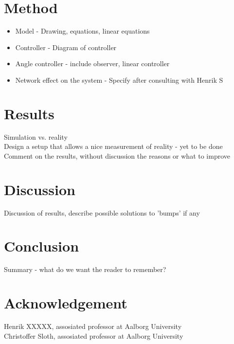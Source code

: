 \section{Method}
\begin{itemize}
\item Model - Drawing, equations, linear equations
\item Controller - Diagram of controller 
	\item Angle controller - include observer, linear controller
\item Network effect on the system - Specify after consulting with Henrik S
\end{itemize}
\section{Results}
Simulation vs. reality \\
Design a setup that allows a nice measurement of reality - yet to be done\\
Comment on the results, without discussion the reasons or what to improve

\section{Discussion}
Discussion of results, describe possible solutions to 'bumps' if any

\section{Conclusion}
Summary - what do we want the reader to remember? 
\section*{Acknowledgement}
Henrik XXXXX, assosiated professor at Aalborg University \\
Christoffer Sloth, assosiated professor at Aalborg University




%
%




